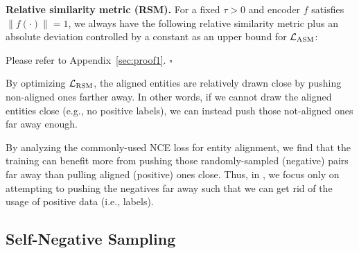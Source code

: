 \begin{proposition}{\bf Relative similarity metric (RSM).} \label{th:rsm}
For a fixed $\tau > 0$ and encoder $f$ satisfies $\|f(\cdot)\|=1$, we always have the following relative similarity metric plus an absolute deviation controlled by a constant as an upper bound for $\mathcal{L}_{\rm ASM}$:


\end{proposition}

\vspace{-0.2cm}

\begin{pf}
    Please refer to Appendix~\ref{sec:proof1}. \hfill$\square$
\end{pf}

By optimizing $\mathcal{L}_{\rm RSM}$, the aligned entities are relatively drawn close by pushing non-aligned ones farther away. 
In other words, if we cannot draw the aligned entities close (e.g., no positive labels), we can instead push those not-aligned ones far away enough.

By analyzing the commonly-used NCE loss for entity alignment, we find that the training can benefit more from pushing those randomly-sampled (negative) pairs far away than pulling aligned (positive) ones close. 
Thus, in \solution, we focus only on attempting to pushing the negatives far away such that we can get rid of the usage of positive data (i.e., labels).


\subsection{Self-Negative Sampling}
\label{sec:sns}

